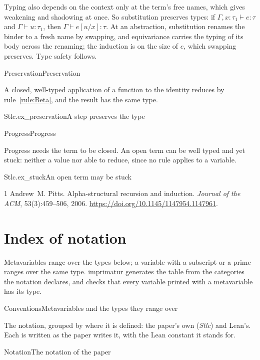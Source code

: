 \documentclass{article}
\begin{document}
Typing also depends on the context only at the term's free names, which
gives weakening and shadowing at once. So
substitution preserves types: if $\Gamma, x{:}\tau_1 \vdash e : \tau$ and
$\Gamma \vdash u : \tau_1$, then $\Gamma \vdash e[u/x] : \tau$. At an
abstraction, substitution renames the binder to a fresh name by swapping, and
equivariance carries the typing of its body across the renaming; the
induction is on the size of $e$, which swapping
preserves. Type safety follows.

\begin{leantheorem}{Preservation}{Preservation}
\end{leantheorem}

A closed, well-typed application of a function to the identity reduces by
rule~\ref{rule:Beta}, and the result has the same type.

\begin{leanexample}{Stlc.ex_preservation}{A step preserves the type}
\end{leanexample}

\begin{leantheorem}{Progress}{Progress}
\end{leantheorem}

Progress needs the term to be closed. An open term can be well typed and yet
stuck: neither a value nor able to reduce, since no rule applies to a
variable.

\begin{leanexample}{Stlc.ex_stuck}{An open term may be stuck}
\end{leanexample}

\begin{thebibliography}{1}
Andrew~M. Pitts.
\newblock Alpha-structural recursion and induction.
\newblock \emph{Journal of the ACM}, 53(3):459--506, 2006.
\newblock \url{https://doi.org/10.1145/1147954.1147961}.
\end{thebibliography}

\appendix
\section{Index of notation}\label{app:notation}

Metavariables range over the types below; a variable with a subscript or a
prime ranges over the same type. imprimatur generates the table from the
categories the notation declares, and checks that every variable printed with
a metavariable has its type.

\begin{leanconventions}{Conventions}{Metavariables and the types they range over}
\end{leanconventions}

The notation, grouped by where it is defined: the paper's own (\textit{Stlc})
and Lean's. Each is written as the paper writes it, with the Lean constant it
stands for.

\begin{leannotation}{Notation}{The notation of the paper}
\end{leannotation}
\end{document}
